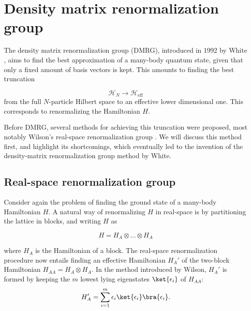 
\section{Density matrix renormalization group}

The density matrix renormalization group (DMRG), introduced in 1992 by
White \cite{white1992density}, aims to find the best approximation of
a many-body quantum state, given that only a fixed amount of basis vectors
is kept. This amounts to finding the best truncation

\begin{equation}
  \mathcal{H}_N \rightarrow \mathcal{H}_{\text{eff}}
\end{equation}
from the full $N$-particle Hilbert space to an effective lower dimensional
one. This corresponds to renormalizing the Hamiltonian $H$.

Before DMRG, several methods for achieving this truncation were proposed, most notably
Wilson's real-space renormalization group \cite{wilson1975renormalization}. We will
discuss this method first, and highlight its shortcomings, which eventually led to the
invention of the density-matrix renormalization group method by White.

\subsection{Real-space renormalization group}

Consider again the problem of finding the ground state of a many-body
Hamiltonian $H$. A natural way of renormalizing $H$ in real-space is by
partitioning the lattice in blocks, and writing $H$ as

\begin{equation}
  H = H_A \otimes \ldots \otimes H_A
\end{equation}

where $H_A$ is the Hamiltonian of a block.  The real-space
renormalization procedure now entails finding an effective Hamiltonian $H_{A}'$ of the
two-block Hamiltonian $H_{AA} = H_A \otimes H_A$. In the method introduced
by Wilson, $H_{A}'$ is formed by keeping the $m$ lowest lying eigenstates
$\ket{\epsilon_{i}}$ of $H_{AA}$:
\begin{equation}
  H_{A}' = \sum_{i = 1}^{m} \epsilon_{i} \ket{\epsilon_{i}}\bra{\epsilon_{i}}.
 \end{equation}

